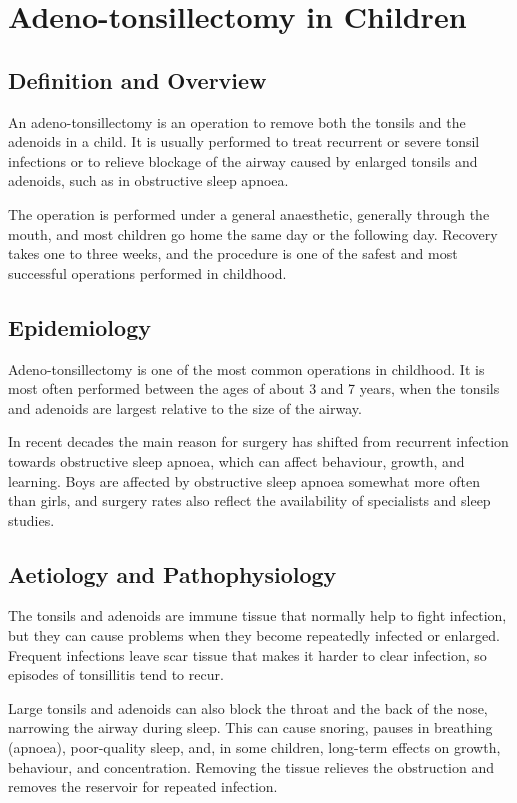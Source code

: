 \chapter{Adeno-tonsillectomy in Children}

\section*{Definition and Overview}
An adeno-tonsillectomy is an operation to remove both the tonsils and the adenoids in a child. It is usually performed to treat recurrent or severe tonsil infections or to relieve blockage of the airway caused by enlarged tonsils and adenoids, such as in obstructive sleep apnoea.

The operation is performed under a general anaesthetic, generally through the mouth, and most children go home the same day or the following day. Recovery takes one to three weeks, and the procedure is one of the safest and most successful operations performed in childhood.

\section*{Epidemiology}
Adeno-tonsillectomy is one of the most common operations in childhood. It is most often performed between the ages of about 3 and 7 years, when the tonsils and adenoids are largest relative to the size of the airway.

In recent decades the main reason for surgery has shifted from recurrent infection towards obstructive sleep apnoea, which can affect behaviour, growth, and learning. Boys are affected by obstructive sleep apnoea somewhat more often than girls, and surgery rates also reflect the availability of specialists and sleep studies.

\section*{Aetiology and Pathophysiology}
The tonsils and adenoids are immune tissue that normally help to fight infection, but they can cause problems when they become repeatedly infected or enlarged. Frequent infections leave scar tissue that makes it harder to clear infection, so episodes of tonsillitis tend to recur.

Large tonsils and adenoids can also block the throat and the back of the nose, narrowing the airway during sleep. This can cause snoring, pauses in breathing (apnoea), poor-quality sleep, and, in some children, long-term effects on growth, behaviour, and concentration. Removing the tissue relieves the obstruction and removes the reservoir for repeated infection.

